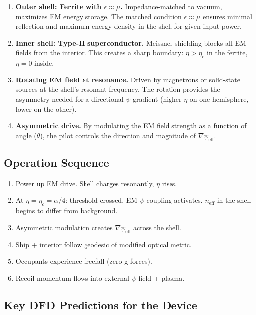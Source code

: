 \documentclass[12pt, letterpaper]{article}
\theoremstyle{definition}
\theoremstyle{remark}
\newcommand{\neff}{n_{\mathrm{eff}}}
\newcommand{\etac}{\eta_c}
\begin{document}
\begin{enumerate}
\item \textbf{Outer shell: Ferrite with $\epsilon \approx \mu$.}
Impedance-matched to vacuum, maximizes EM energy storage. The matched
condition $\epsilon \approx \mu$ ensures minimal reflection and maximum
energy density in the shell for given input power.

\item \textbf{Inner shell: Type-II superconductor.}
Meissner shielding blocks all EM fields from the interior. This creates
a sharp boundary: $\eta > \etac$ in the ferrite, $\eta = 0$ inside.

\item \textbf{Rotating EM field at resonance.}
Driven by magnetrons or solid-state sources at the shell's resonant
frequency. The rotation provides the asymmetry needed for a directional
$\psi$-gradient (higher $\eta$ on one hemisphere, lower on the other).

\item \textbf{Asymmetric drive.}
By modulating the EM field strength as a function of angle ($\theta$),
the pilot controls the direction and magnitude of $\nabla\psi_{\mathrm{eff}}$.
\end{enumerate}

\subsection{Operation Sequence}

\begin{enumerate}
\item Power up EM drive. Shell charges resonantly, $\eta$ rises.
\item At $\eta = \etac = \alpha/4$: threshold crossed. EM-$\psi$ coupling
activates. $\neff$ in the shell begins to differ from background.
\item Asymmetric modulation creates $\nabla\psi_{\mathrm{eff}}$ across
the shell.
\item Ship + interior follow geodesic of modified optical metric.
\item Occupants experience freefall (zero g-forces).
\item Recoil momentum flows into external $\psi$-field + plasma.
\end{enumerate}

\subsection{Key DFD Predictions for the Device}
\end{document}
